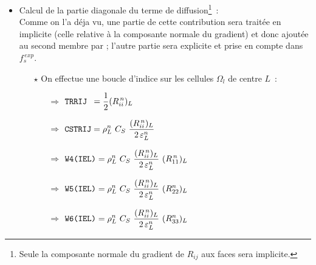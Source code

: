 \begin{itemize}
\item Calcul de la partie diagonale du terme de diffusion\footnote{Seule la
composante normale  du  gradient de $R_{ij}$ aux faces sera implicite.}~:\\
Comme on l'a déja vu, une partie de cette contribution sera traitée en
implicite (celle relative à la composante normale du gradient) et donc
ajoutée au second membre par  ; l'autre
partie sera explicite et prise en compte dans $f_s^{\,exp}$.
\begin{itemize}
\item [$\star$] On effectue une boucle d'indice  sur les cellules
$\Omega_l$ de centre $L$~:
\begin{itemize}
\item [$\Rightarrow$] $\displaystyle \text{\texttt{TRRIJ }}= \frac{1}{2} (R^{\,n}_{ii})_L $
\item [$\Rightarrow$] $\displaystyle \var{CSTRIJ} = \rho^n_L \ C_S \ \frac{(R^{\,n}_{ii})_L}{2\,\varepsilon^n_L}$
\item [$\Rightarrow$] $\displaystyle \var{W4(IEL)} = \rho^n_L \ C_S \
\frac{(R^{\,n}_{ii})_L}{2\,\varepsilon^n_L} \ (R^{\,n}_{11})_L$
\item [$\Rightarrow$] $\displaystyle \var{W5(IEL)} = \rho^n_L \ C_S \ \frac{(R^{\,n}_{ii})_L}{2\,\varepsilon^n_L}\ (R^n_{22})_L$
\item [$\Rightarrow$] $\displaystyle \var{W6(IEL)} = \rho^n_L \ C_S \ \frac{(R^{\,n}_{ii})_L}{2\,\varepsilon^n_L} \ (R^n_{33})_L$
\end{itemize}



\end{itemize}
\end{itemize}
